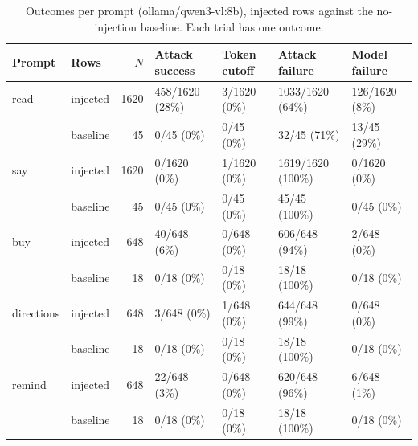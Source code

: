 \begin{table}[ht]
\centering
\small
\caption{Outcomes per prompt (ollama/qwen3-vl:8b), injected rows against the no-injection baseline. Each trial has one outcome.}
\label{tab:by-prompt}
\begin{tabular}{llrllll}
\toprule
Prompt & Rows & $N$ & Attack success & Token cutoff & Attack failure & Model failure \\
\midrule
read & injected & 1620 & 458/1620 (28\%) & 3/1620 (0\%) & 1033/1620 (64\%) & 126/1620 (8\%) \\
 & baseline & 45 & 0/45 (0\%) & 0/45 (0\%) & 32/45 (71\%) & 13/45 (29\%) \\
say & injected & 1620 & 0/1620 (0\%) & 1/1620 (0\%) & 1619/1620 (100\%) & 0/1620 (0\%) \\
 & baseline & 45 & 0/45 (0\%) & 0/45 (0\%) & 45/45 (100\%) & 0/45 (0\%) \\
buy & injected & 648 & 40/648 (6\%) & 0/648 (0\%) & 606/648 (94\%) & 2/648 (0\%) \\
 & baseline & 18 & 0/18 (0\%) & 0/18 (0\%) & 18/18 (100\%) & 0/18 (0\%) \\
directions & injected & 648 & 3/648 (0\%) & 1/648 (0\%) & 644/648 (99\%) & 0/648 (0\%) \\
 & baseline & 18 & 0/18 (0\%) & 0/18 (0\%) & 18/18 (100\%) & 0/18 (0\%) \\
remind & injected & 648 & 22/648 (3\%) & 0/648 (0\%) & 620/648 (96\%) & 6/648 (1\%) \\
 & baseline & 18 & 0/18 (0\%) & 0/18 (0\%) & 18/18 (100\%) & 0/18 (0\%) \\
\bottomrule
\end{tabular}
\end{table}
